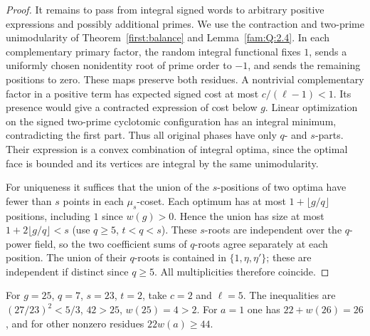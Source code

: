 \documentclass[11pt,a4paper]{article}
\numberwithin{equation}{section}
\theoremstyle{remark}
\begin{document}
\begin{proof}
It remains to pass from integral signed words to arbitrary positive
expressions and possibly additional primes. We use the contraction
and two-prime unimodularity of Theorem~\ref{first:balance} and Lemma~\ref{fam:Q:2.4}.
In each complementary primary factor, the random integral functional
fixes $1$, sends a uniformly chosen nonidentity root of prime order
to $-1$, and sends the remaining positions to zero. These maps preserve
both residues. A nontrivial complementary factor in a positive term
has expected signed cost at most $c/(\ell-1)<1$. Its presence would
give a contracted expression of cost below $g$. Linear optimization
on the signed two-prime cyclotomic configuration has an integral
minimum, contradicting the first part. Thus all original phases have
only $q$- and $s$-parts. Their expression is a convex combination of
integral optima, since the optimal face is bounded and its vertices
are integral by the same unimodularity.

For uniqueness it suffices that the union of the $s$-positions of
two optima have fewer than $s$ points in each $\mu_s$-coset. Each
optimum has at most $1+\lfloor g/q\rfloor$ positions, including $1$
since $w(g)>0$. Hence the union has size at most
$1+2\lfloor g/q\rfloor<s$ (use $q\ge5$, $t<q<s$).
These $s$-roots are independent over the $q$-power field, so the
two coefficient sums of $q$-roots agree separately at each position.
The union of their $q$-roots is contained in $\{1,\eta,\eta'\}$;
these are independent if distinct since $q\ge5$. All multiplicities
therefore coincide.
\end{proof}

For $g=25$, $q=7$, $s=23$, $t=2$, take $c=2$ and $\ell=5$.
The inequalities are $(27/23)^2<5/3$, $42>25$, $w(25)=4>2$.
For $a=1$ one has $22+w(26)=26$, and for other nonzero residues
$22w(a)\ge44$.
\end{document}
